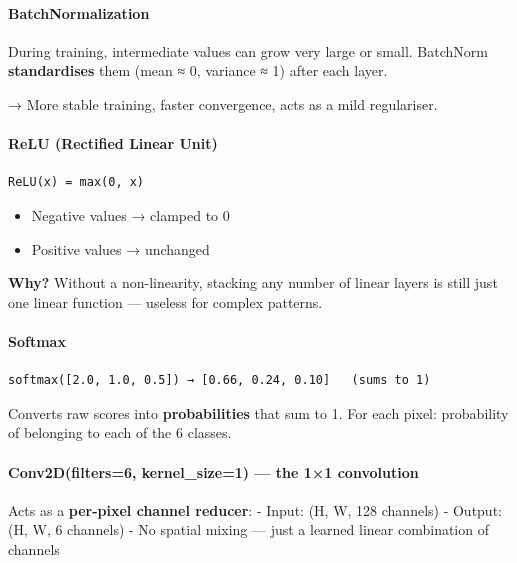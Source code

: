 \documentclass[11pt]{article}
\providecommand{\tightlist}{%
      \setlength{\itemsep}{0pt}\setlength{\parskip}{0pt}}
\begin{document}
\paragraph{BatchNormalization}\label{batchnormalization}

During training, intermediate values can grow very large or small.
BatchNorm \textbf{standardises} them (mean ≈ 0, variance ≈ 1) after each
layer.

→ More stable training, faster convergence, acts as a mild regulariser.

\paragraph{ReLU (Rectified Linear
Unit)}\label{relu-rectified-linear-unit}

\begin{verbatim}
ReLU(x) = max(0, x)
\end{verbatim}

\begin{itemize}
\tightlist
\item
  Negative values → clamped to 0
\item
  Positive values → unchanged
\end{itemize}

\textbf{Why?} Without a non-linearity, stacking any number of linear
layers is still just one linear function --- useless for complex
patterns.

\paragraph{Softmax}\label{softmax}

\begin{verbatim}
softmax([2.0, 1.0, 0.5]) → [0.66, 0.24, 0.10]   (sums to 1)
\end{verbatim}

Converts raw scores into \textbf{probabilities} that sum to 1. For each
pixel: probability of belonging to each of the 6 classes.

\paragraph{Conv2D(filters=6, kernel\_size=1) --- the 1×1
convolution}\label{conv2dfilters6-kernel_size1-the-11-convolution}

Acts as a \textbf{per-pixel channel reducer}: - Input: (H, W, 128
channels) - Output: (H, W, 6 channels) - No spatial mixing --- just a
learned linear combination of channels
\end{document}
